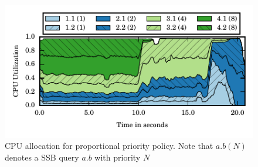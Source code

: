 \begin{figure}[t]
	\centering
	\includegraphics[width=\columnwidth]{figures/ssb-priority-uniform-2queries-perclass-cpu-util.pdf}
	\vspace{-2.5em}
	\caption{CPU allocation for proportional priority policy. Note that $a.b  (N)$ denotes a SSB query $a.b$ with priority $N$}
	\label{fig:pp-cpu-util}
\end{figure}
